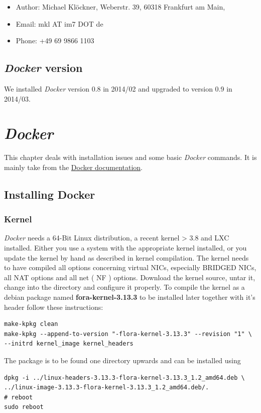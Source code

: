 \documentclass[captions=tableheading]{article}
\begin{document}
\begin{itemize}
\item Author: Michael Klöckner, Weberstr. 39, 60318 Frankfurt am Main,
\item Email: mkl AT im7 DOT de
\item Phone: +49 69 9866 1103
\end{itemize}
\subsection{\emph{Docker} version}
\label{sec-1-4}

   We installed \emph{Docker} version 0.8 in 2014/02 and upgraded to version 0.9 in 2014/03.
\section{\emph{Docker}}
\label{sec-2}

This chapter deals with installation issues and some basic \emph{Docker} commands. It is mainly take from the \href{http://docs.docer.io/en/latest/}{Docker documentation}. 
\subsection{Installing Docker}
\label{sec-2-1}
\subsubsection{Kernel}
\label{sec-2-1-1}

\emph{Docker} needs a 64-Bit Linux distribution, a recent kernel > 3.8 and LXC
installed. Either you use a system with the appropriate kernel installed, or
you update the kernel by hand as described in kernel compilation. The kernel needs to have compiled all options concerning virtual NICs, especially
BRIDGED NICs, all NAT options and all net  ( NF ) options. Download
the kernel source, untar it, change into the directory and configure it properly. To compile the kernel as a debian package named \textbf{fora-kernel-3.13.3}
to be installed later together with it's header follow these instructions:

\begin{verbatim}
make-kpkg clean
make-kpkg --append-to-version "-flora-kernel-3.13.3" --revision "1" \
--initrd kernel_image kernel_headers
\end{verbatim}
The package is to be found one directory upwards and can be installed using

\begin{verbatim}
dpkg -i ../linux-headers-3.13.3-flora-kernel-3.13.3_1.2_amd64.deb \
../linux-image-3.13.3-flora-kernel-3.13.3_1.2_amd64.deb/.
# reboot
sudo reboot
\end{verbatim}
\end{document}
